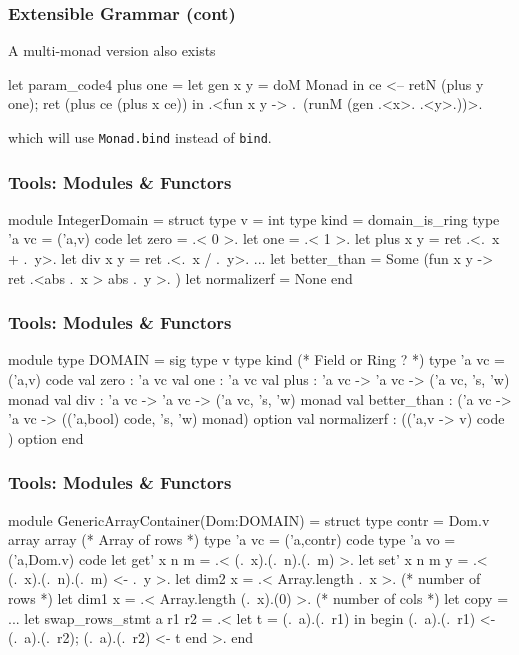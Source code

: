 \documentclass{beamer}
\begin{document}
\begin{frame}[fragile]
    \frametitle{Extensible Grammar (cont) }
A multi-monad version also exists
\begin{code}
let param_code4 plus one =
  let gen x y = doM Monad in
                    ce <-- retN (plus y one);
                    ret (plus ce (plus x ce))
  in .<fun x y -> .~(runM (gen .<x>. .<y>.))>.
\end{code}
which will use \verb+Monad.bind+ instead of \verb+bind+.
\end{frame}

\begin{frame}[fragile]
    \frametitle{Tools: Modules \& Functors}
\begin{code}
module IntegerDomain = 
  struct
    type v = int
    type kind = domain_is_ring
    type 'a vc = ('a,v) code
    let zero = .< 0 >.  
    let one = .< 1 >. 
    let plus x y = ret .<.~x + .~y>. 
    let div x y = ret .<.~x / .~y>.
    ...
    let better_than = Some (fun x y -> ret .<abs .~x > abs .~y >. )
    let normalizerf = None 
end
\end{code}
\end{frame}

\begin{frame}[fragile]
    \frametitle{Tools: Modules \& Functors}
\begin{code}
module type DOMAIN = sig
  type v
  type kind (* Field or Ring ? *)
  type 'a vc = ('a,v) code
  val zero : 'a vc
  val one : 'a vc
  val plus : 'a vc -> 'a vc -> ('a vc, 's, 'w) monad
  val div : 'a vc -> 'a vc -> ('a vc, 's, 'w) monad
  val better_than : ('a vc -> 'a vc -> 
                    (('a,bool) code, 's, 'w) monad) option
  val normalizerf : (('a,v -> v) code ) option
end 
\end{code}
\end{frame}

\begin{frame}[fragile]
    \frametitle{Tools: Modules \& Functors}
\begin{code}
module GenericArrayContainer(Dom:DOMAIN) = struct
  type contr = Dom.v array array (* Array of rows *)
  type 'a vc = ('a,contr) code
  type 'a vo = ('a,Dom.v) code
  let get' x n m = .< (.~x).(.~n).(.~m) >.
  let set' x n m y = .< (.~x).(.~n).(.~m) <- .~y >.
  let dim2 x = .< Array.length .~x >.       (* number of rows *)
  let dim1 x = .< Array.length (.~x).(0) >. (* number of cols *)
  let copy = ...
  let swap_rows_stmt a r1 r2 =
      .< let t = (.~a).(.~r1) in
         begin 
             (.~a).(.~r1) <- (.~a).(.~r2);
             (.~a).(.~r2) <- t
         end >.
end
\end{code}
\end{frame}
\end{document}
